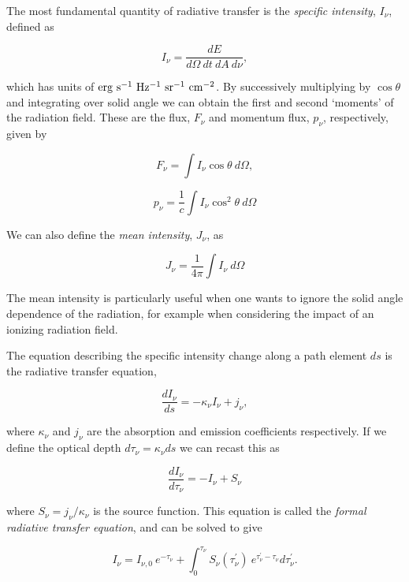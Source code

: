 The most fundamental quantity of radiative transfer is the 
{\em specific intensity}, $I_\nu$, defined as

\begin{equation}
I_\nu = \frac{dE}{d\Omega~dt~dA~d\nu},
\end{equation}

which has units of ${\rm erg~s^{-1}~Hz^{-1}~sr^{-1}~cm^{-2}}$.
By successively multiplying by $\cos \theta$ and integrating over solid angle we 
can obtain the first and second `moments' of the radiation field. These
are the flux, $F_\nu$ and momentum flux, $p_\nu$, respectively, given by

\begin{equation}
F_\nu = \int I_\nu \cos \theta~d \Omega,
\end{equation}

\begin{equation}
p_\nu = \frac{1}{c} \int I_\nu \cos^2 \theta~d \Omega
\end{equation}

We can also define the {\em mean intensity}, $J_\nu$, as

\begin{equation}
J_\nu = \frac{1}{4 \pi} \int I_\nu~d \Omega
\end{equation}

The mean intensity is particularly
useful when one wants to ignore the solid angle dependence of the radiation,
for example when considering the impact of an ionizing radiation field.

The equation describing the specific intensity change along a path element $ds$
is the radiative transfer equation, 

\begin{equation}
\frac{d I_\nu}{ds} = -\kappa_\nu I_\nu + j_\nu, 
\end{equation}

where $\kappa_\nu$ and $j_\nu$ are the absorption and emission coefficients respectively.
If we define the optical depth $d \tau_\nu = \kappa_\nu ds$ we can recast this as

\begin{equation}
\frac{d I_\nu}{d \tau_\nu} = -I_\nu + S_\nu
\label{eq:formal_rte}
\end{equation}

where $S_\nu=j_\nu/\kappa_\nu$ is the source function. This equation
is called the {\em formal radiative transfer equation}, and can be solved to give 

\begin{equation}
I_\nu = I_{\nu,0}~e^{-\tau_\nu} + \int^{\tau_\nu}_0 S_\nu (\tau^\prime_\nu)~e^{\tau^\prime_\nu-\tau_\nu} d \tau^\prime_\nu.
\label{eq:rte_solution}
\end{equation}

